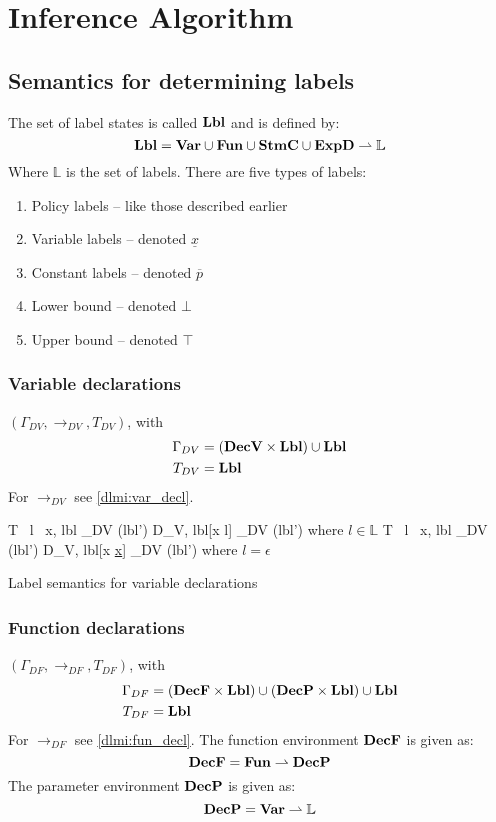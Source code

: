 
\section{Inference Algorithm}

\subsection{Semantics for determining labels}
The set of label states is called $\mathbf{Lbl}$ and is defined by:
\[
  \mathbf{Lbl} = \mathbf{Var} \cup \mathbf{Fun} \cup \mathbf{StmC} \cup \mathbf{ExpD} \rightharpoonup \mathbb{L}
\]
Where $\mathbb{L}$ is the set of labels.
There are five types of labels:
\begin{enumerate}
  \item Policy labels -- like those described earlier
  \item Variable labels -- denoted $\underline{x}$
  \item Constant labels -- denoted $\overline{p}$
  \item Lower bound -- denoted $\bot$
  \item Upper bound -- denoted $\top$
\end{enumerate}

\subsubsection{Variable declarations}
$(\Gamma_{DV}, \rightarrow_{DV}, T_{DV})$, with
\begin{align*}
  \Gamma_{DV} & = (\mathbf{DecV} \times \mathbf{Lbl}) \cup \mathbf{Lbl} \\
  T_{DV} & = \mathbf{Lbl} \\
\end{align*}
For $\rightarrow_{DV}$ see \cref{dlmi:var_decl}.

\begin{table}
        {\langle T \, l \, x, lbl \rangle \rightarrow_{DV} (lbl')}
        {\langle D_V, lbl[x \mapsto l] \rangle \rightarrow_{DV} (lbl')}
        {where $l \in \mathbb{L}$}
        {\langle T \, l \, x, lbl \rangle \rightarrow_{DV} (lbl')}
        {\langle D_V, lbl[x \mapsto \underline{x}] \rangle \rightarrow_{DV} (lbl')}
        {where $l = \epsilon$}
\caption{Label semantics for variable declarations}
\label{dlmi:var_decl}
\end{table}

\subsubsection{Function declarations}
$(\Gamma_{DF}, \rightarrow_{DF}, T_{DF})$, with
\begin{align*}
  \Gamma_{DF} & = (\mathbf{DecF} \times \mathbf{Lbl}) \cup (\mathbf{DecP} \times \mathbf{Lbl}) \cup \mathbf{Lbl} \\
  T_{DF} & = \mathbf{Lbl}
\end{align*}
For $\rightarrow_{DF}$ see \cref{dlmi:fun_decl}.
The function environment $\mathbf{DecF}$ is given as:
\[ \mathbf{DecF} = \mathbf{Fun} \rightharpoonup \mathbf{DecP} \]
The parameter environment $\mathbf{DecP}$ is given as:
\[ \mathbf{DecP} = \mathbf{Var} \rightharpoonup \mathbb{L} \]


